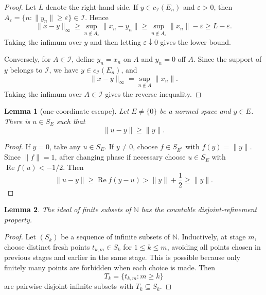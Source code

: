 \documentclass[11pt]{article}
\newtheorem{lemma}{Lemma}
\newcommand{\N}{\mathbb N}
\newcommand{\cI}{\mathcal I}
\begin{document}
\begin{proof}
Let \(L\) denote the right-hand side.  If \(y\in c_\cI(E_n)\) and
\(\varepsilon>0\), then \(A_\varepsilon=\{n:\|y_n\|\ge\varepsilon\}\in\cI\).
Hence
\[
        \|x-y\|_\infty
        \ge
        \sup_{n\notin A_\varepsilon}\|x_n-y_n\|
        \ge
        \sup_{n\notin A_\varepsilon}\|x_n\|-\varepsilon
        \ge L-\varepsilon.
\]
Taking the infimum over \(y\) and then letting \(\varepsilon\downarrow0\)
gives the lower bound.

Conversely, for \(A\in\cI\), define \(y_n=x_n\) on \(A\) and \(y_n=0\) off
\(A\).  Since the support of \(y\) belongs to \(\cI\), we have
\(y\in c_\cI(E_n)\), and
\[
        \|x-y\|_\infty=\sup_{n\notin A}\|x_n\|.
\]
Taking the infimum over \(A\in\cI\) gives the reverse inequality.
\end{proof}

\begin{lemma}[one-coordinate escape]
\label{lem:coordinate-escape}
Let \(E\ne\{0\}\) be a normed space and \(y\in E\).  There is
\(u\in S_E\) such that
\[
        \|u-y\|\ge \|y\|.
\]
\end{lemma}

\begin{proof}
If \(y=0\), take any \(u\in S_E\).  If \(y\ne0\), choose \(f\in S_{E^*}\) with
\(f(y)=\|y\|\).  Since \(\|f\|=1\), after changing phase if necessary choose
\(u\in S_E\) with \(\operatorname{Re}f(u)<-1/2\).  Then
\[
        \|u-y\|\ge \operatorname{Re}f(y-u)>\|y\|+\frac12\ge\|y\|.
\]
\end{proof}

\begin{lemma}
\label{lem:fin-has-refinement}
The ideal of finite subsets of \(\N\) has the countable disjoint-refinement
property.
\end{lemma}

\begin{proof}
Let \((S_k)\) be a sequence of infinite subsets of \(\N\).  Inductively, at
stage \(m\), choose distinct fresh points \(t_{k,m}\in S_k\) for
\(1\le k\le m\), avoiding all points chosen in previous stages and earlier in
the same stage.  This is possible because only finitely many points are
forbidden when each choice is made.  Then
\[
        T_k=\{t_{k,m}:m\ge k\}
\]
are pairwise disjoint infinite subsets with \(T_k\subseteq S_k\).
\end{proof}
\end{document}
